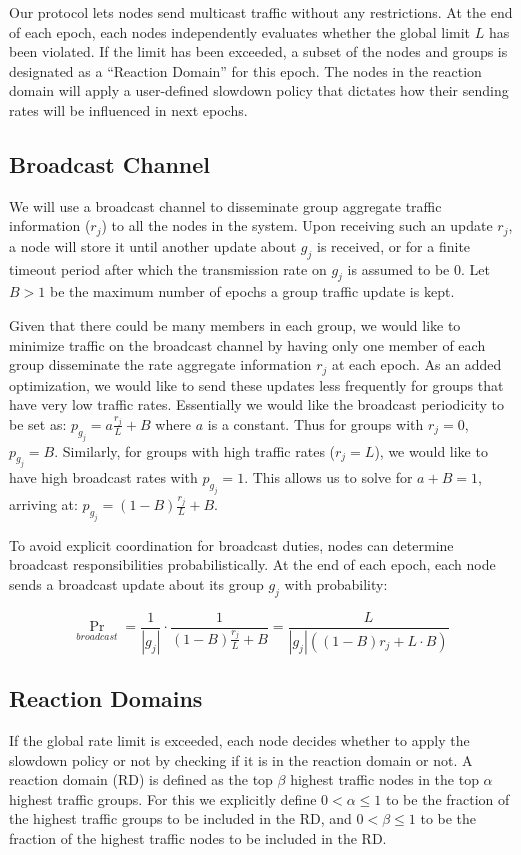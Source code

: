 \documentclass[lettersize,12pt]{article}
\begin{document}
Our protocol lets nodes send multicast traffic without any restrictions. At the end of each epoch, each nodes independently evaluates whether the global limit $L$ has been violated. If the limit has been exceeded, a subset of the nodes and groups is designated as a ``Reaction Domain'' for this epoch. The nodes in the reaction domain will apply a user-defined slowdown policy that dictates how their sending rates will be influenced in next epochs.

\subsection{Broadcast Channel}
We will use a broadcast channel to disseminate group aggregate traffic information ($r_j$) to all the nodes in the system. Upon receiving such an update $r_j$, a node will store it until another update about $g_j$ is received, or for a finite timeout period after which the transmission rate on $g_j$ is assumed to be 0. Let $B > 1$ be the maximum number of epochs a group traffic update is kept.

Given that there could be many members in each group, we would like to minimize traffic on the broadcast channel by having only one member of each group disseminate the rate aggregate information $r_j$ at each epoch. As an added optimization, we would like to send these updates less frequently for groups that have very low traffic rates. Essentially we would like the broadcast periodicity to be set as: $p_{g_j} = a \frac{r_j}{L} + B$ where $a$ is a constant. Thus for groups with $r_j = 0$, $p_{g_j} = B$. Similarly, for groups with high traffic rates ($r_j = L$), we would like to have high broadcast rates with $p_{g_j} = 1$. This allows us to solve for $a + B = 1$, arriving at: $p_{g_j} = (1 - B) \frac{r_j}{L} + B$.

To avoid explicit coordination for broadcast duties, nodes can determine broadcast responsibilities probabilistically. At the end of each epoch, each node sends a broadcast update about its group $g_j$ with probability:

\[ \Pr_{broadcast} = \frac{1}{|g_j|} \cdot \frac{1}{(1-B) \frac{r_j}{L} + B}
=
\frac{L}{|g_j| \left( (1-B) r_j + L \cdot B \right) } \]

\subsection{Reaction Domains}
If the global rate limit is exceeded, each node decides whether to apply the slowdown policy or not by checking if it is in the reaction domain or not. A reaction domain (RD) is defined as the top $\beta$ highest traffic nodes in the top $\alpha$ highest traffic groups. For this we explicitly define $0 < \alpha \leq 1$ to be the fraction of the highest traffic groups to be included in the RD, and $0 < \beta \leq 1$ to be the fraction of the highest traffic nodes to be included in the RD.
\end{document}

